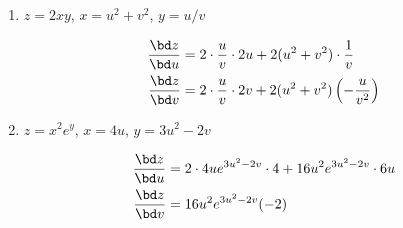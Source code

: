 \documentclass[12pt,reqno]{amsart}
\begin{document}
\begin{enumerate}
\item $z = 2xy$, $x = u^2+v^2$, $y = u/v$

\bigskip
\textcolor{red}{
\begin{align*}
\frac{\bd z}{\bd u} &= 2\cdot \frac{u}{v} \cdot 2u + 2 (u^2+v^2) \cdot \frac{1}{v} \\
\frac{\bd z}{\bd v} &= 2 \cdot \frac{u}{v} \cdot 2v + 2(u^2+v^2) \left( -\frac{u}{v^2} \right)
\end{align*}}
\bigskip

\item $z = x^2 e^y$, $x = 4u$, $y = 3u^2-2v$

\bigskip
\textcolor{red}{
\begin{align*}
\frac{\bd z}{\bd u} &= 2\cdot 4ue^{3u^2-2v}\cdot 4 + 16u^2 e^{3u^2-2v} \cdot 6u \\
\frac{\bd z}{\bd v} &= 16u^2e^{3u^2-2v}(-2)
\end{align*}}

\end{enumerate}
\end{document}
